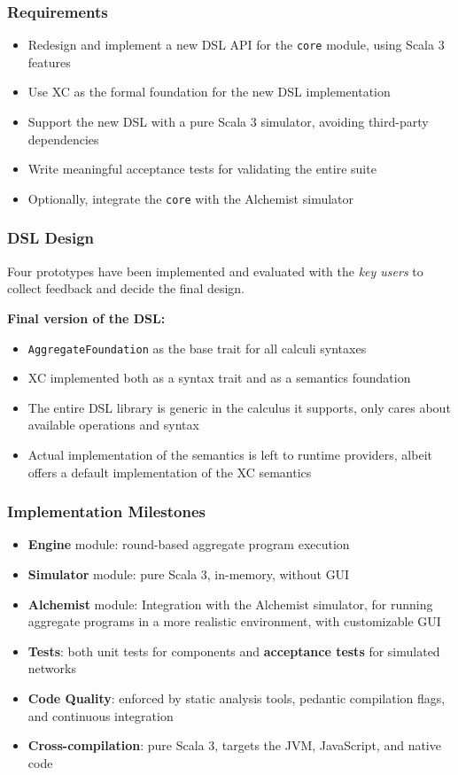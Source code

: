 \begin{frame}
    \frametitle{Requirements}
    \begin{itemize}
        \item Redesign and implement a new \ac{DSL} \ac{API} for the \texttt{core} module, using Scala 3 features
        \item Use \ac{XC} as the formal foundation for the new \ac{DSL} implementation
        \item Support the new \ac{DSL} with a pure Scala 3 simulator, avoiding third-party dependencies
        \item Write meaningful acceptance tests for validating the entire suite
        \item Optionally, integrate the \texttt{core} with the Alchemist simulator
    \end{itemize}
\end{frame}

\begin{frame}
    \frametitle{\ac{DSL} Design}
    Four prototypes have been implemented and evaluated with the \textit{key users} to collect feedback and decide the final design.

    \textbf{Final version of the \ac{DSL}:}
    \begin{itemize}
        \item \texttt{AggregateFoundation} as the base trait for all calculi syntaxes
        \item \ac{XC} implemented both as a syntax trait and as a semantics foundation
        \item The entire \ac{DSL} library is generic in the calculus it supports, only cares about available operations and syntax
        \item Actual implementation of the semantics is left to runtime providers, albeit \this offers a default implementation of the \ac{XC} semantics
    \end{itemize}
\end{frame}

\begin{frame}
    \frametitle{Implementation Milestones}
    \begin{itemize}
        \item \textbf{Engine} module: round-based aggregate program execution
        \item \textbf{Simulator} module: pure Scala 3, in-memory, without \ac{GUI}
        \item \textbf{Alchemist} module: Integration with the Alchemist simulator, for running aggregate programs in a more realistic environment, with customizable \ac{GUI}
        \item \textbf{Tests}: both unit tests for components and \textbf{acceptance tests} for simulated networks
        \item \textbf{Code Quality}: enforced by static analysis tools, pedantic compilation flags, and continuous integration
        \item \textbf{Cross-compilation}: pure Scala 3, targets the \ac{JVM}, JavaScript, and native code
    \end{itemize}
\end{frame}

